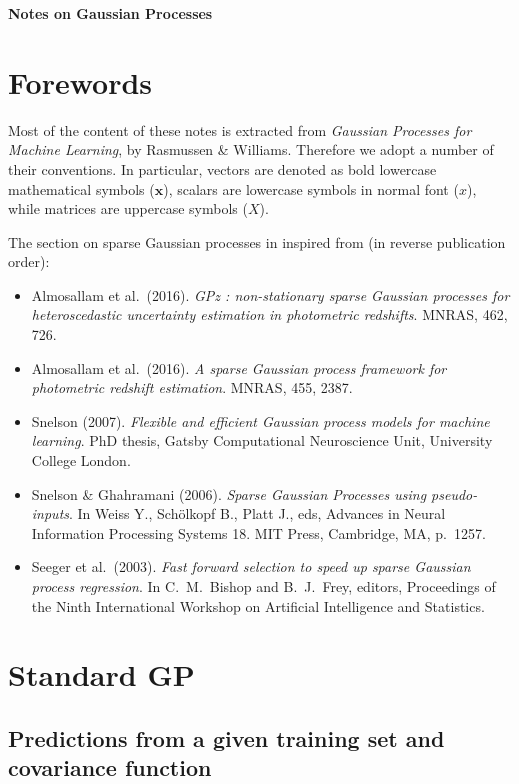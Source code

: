 \documentclass[11pt,a4paper]{article}
\numberwithin{equation}{section}
\begin{document}
{\huge \bfseries Notes on Gaussian Processes\\[1.5cm]}

\section{Forewords}

Most of the content of these notes is extracted from {\it Gaussian Processes for Machine Learning}, by Rasmussen \& Williams. Therefore we adopt a number of their conventions. In particular, vectors are denoted as bold lowercase mathematical symbols ($\mathbf{x}$), scalars are lowercase symbols in normal font ($x$), while matrices are uppercase symbols ($X$).

The section on sparse Gaussian processes in inspired from (in reverse publication order):
\begin{itemize}
  \item Almosallam et al.~(2016). {\it GPz : non-stationary sparse Gaussian processes for heteroscedastic uncertainty estimation in photometric redshifts}. MNRAS, 462, 726.
  \item Almosallam et al.~(2016). {\it A sparse Gaussian process framework for photometric redshift estimation}. MNRAS, 455, 2387.
  \item Snelson (2007). {\it Flexible and efficient Gaussian process models for machine learning}. PhD thesis, Gatsby Computational Neuroscience Unit, University College London.
  \item Snelson \& Ghahramani (2006). {\it Sparse Gaussian Processes using pseudo-inputs}. In Weiss Y., Sch\"olkopf B., Platt J., eds, Advances in Neural Information Processing Systems 18. MIT Press, Cambridge, MA, p.~1257.
  \item Seeger et al.~(2003). {\it Fast forward selection to speed up sparse Gaussian process regression}. In C.~M.~Bishop and B.~J.~Frey, editors, Proceedings of the Ninth International Workshop on Artificial Intelligence and Statistics.
\end{itemize}

\section{Standard GP}

\subsection{Predictions from a given training set and covariance function}
\end{document}
